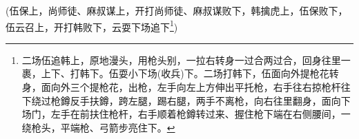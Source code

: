 {\vspace{5pt}

(伍保{\hwfs 上}，尚师徒、麻叔谋{\hwfs 上}，{\hwfs 开打}尚师徒、麻叔谋{\hwfs 败下}，韩擒虎{\hwfs 上}，伍保{\hwfs 败下}，伍云召{\hwfs 上}，{\hwfs 开打}韩败{\hwfs 下}，云{\hwfs 耍下场追下}\footnote{{\hwfs 二场}伍{\hwfs 追}韩{\hwfs 上}，{\hwfs 原地漫头}，{\hwfs 用枪头别}，{\hwfs 一拉右转身一过合两过合}，{\hwfs 回身往里一裹}，{\hwfs 上下}、{\hwfs 打}韩{\hwfs 下}。伍{\hwfs 耍小下场}({\hwfs 收兵}){\hwfs 下}。{\hwfs 二场打}韩{\hwfs 下}，伍{\hwfs 面向外提枪花转身}，{\hwfs 面向外三个提枪花}，{\hwfs 出枪}，{\hwfs 左手向左上方伸出平托枪}，{\hwfs 右手往右掠枪杆往下绕过枪鐏反手扶鐏}，{\hwfs 跨左腿}，{\hwfs 踢右腿}，{\hwfs 两手不离枪}，{\hwfs 向右往里翻身}，{\hwfs 面向下场门}，{\hwfs 左手在前扶住枪杆}，{\hwfs 右手顺着枪鐏转过来}、{\hwfs 握住枪下端在右侧腰间}，{\hwfs 一绕枪头}，{\hwfs 平端枪}、{\hwfs 弓箭步亮住下}。})

\vspace{5pt}




\vspace{5pt}




\vspace{5pt}


}

